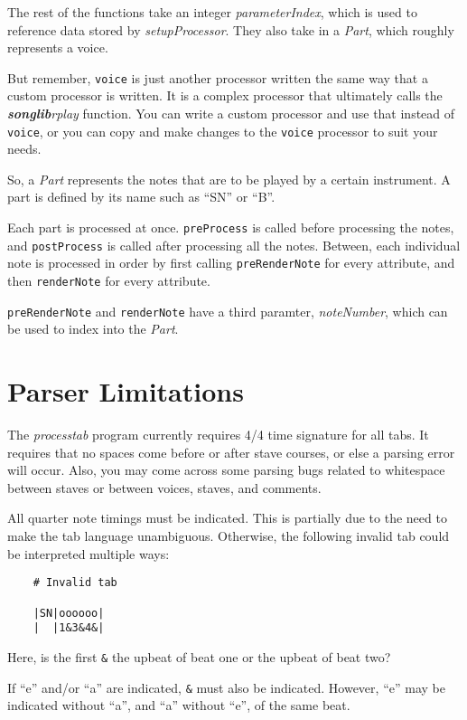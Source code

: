\documentclass{article}
\newcommand\songlib {{\it\bf songlib}}
\begin{document}
The rest of the functions take an integer {\it parameterIndex}, which is used to
reference data stored by {\it setupProcessor}.  They also take in a {\it Part},
which roughly represents a voice.

But remember, \verb!voice! is just another processor written the same way that
a custom processor is written.  It is a complex processor that ultimately calls
the \songlib {\it rplay} function.  You can write a custom processor and use that
instead of \verb!voice!, or you can copy and make changes to the \verb!voice!
processor to suit your needs.

So, a {\it Part} represents the notes that are to be played by a certain
instrument.  A part is defined by its name such as ``SN'' or ``B''.

Each part is processed at once.  \verb!preProcess! is called before processing
the notes, and \verb!postProcess! is called after processing all the notes.
Between, each individual note is processed in order by first calling
\verb!preRenderNote! for every attribute, and then \verb!renderNote! for every
attribute.

\verb!preRenderNote! and \verb!renderNote! have a third paramter, {\it
noteNumber}, which can be used to index into the {\it Part}.

\section*{Parser Limitations}

The {\it processtab} program currently requires 4/4 time signature for all tabs.
It requires that no spaces come before or after stave courses, or else a parsing
error will occur.  Also, you may come across some parsing bugs related to
whitespace between staves or between voices, staves, and comments.

All quarter note timings must be indicated.  This is partially due to the need
to make the tab language unambiguous.  Otherwise, the following invalid tab
could be interpreted multiple ways:

\begin{verbatim}
    # Invalid tab

    |SN|oooooo|
    |  |1&3&4&|
\end{verbatim}

Here, is the first \verb!&! the upbeat of beat one or the upbeat of beat two?

If ``e'' and/or ``a'' are indicated, \verb!&! must also be indicated.  However,
``e'' may be indicated without ``a'', and ``a'' without ``e'', of the same beat.
\end{document}
